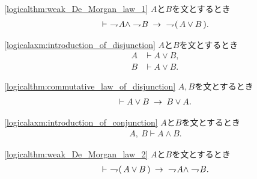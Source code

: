 	\begin{screen}
		\begin{logicalthm}
		\ref{logicalthm:weak_De_Morgan_law_1}
			$A$と$B$を文とするとき
			\begin{align}
				\vdash\ \rightharpoondown\hspace{-0.25em} A \wedge \rightharpoondown\hspace{-0.25em} B
				\hspace{0.25em}\rightarrow\hspace{0.25em}\ \rightharpoondown\hspace{-0.25em} (\, A \vee B\, ).
			\end{align}
		\end{logicalthm}
	\end{screen}
	
	\begin{screen}
		\begin{logicalaxm}[論理和の導入]
		\ref{logicalaxm:introduction_of_disjunction}
			$A$と$B$を文とするとき
			\begin{align}
				A &\vdash A \vee B, \\
				B &\vdash A \vee B.
			\end{align}
		\end{logicalaxm}
	\end{screen}
	
	\begin{screen}
		\begin{logicalthm}[論理和の可換律]
		\ref{logicalthm:commutative_law_of_disjunction}
			$A,B$を文とするとき
			\begin{align}
				\vdash A \vee B \hspace{0.25em}\rightarrow\hspace{0.25em} B \vee A.
			\end{align}
		\end{logicalthm}
	\end{screen}
	
	\begin{screen}
		\begin{logicalaxm}[論理積の導入]
		\ref{logicalaxm:introduction_of_conjunction}
			$A$と$B$を文とするとき
			\begin{align}
				A,\ B \vdash A \wedge B.
			\end{align}
		\end{logicalaxm}
	\end{screen}
	
	\begin{screen}
		\begin{logicalthm}
		\ref{logicalthm:weak_De_Morgan_law_2}
			$A$と$B$を文とするとき
			\begin{align}
				\vdash\ \rightharpoondown\hspace{-0.25em} (\, A \vee B\, ) 
				\hspace{0.25em}\rightarrow\hspace{0.25em}\ \rightharpoondown\hspace{-0.25em} A \wedge \rightharpoondown\hspace{-0.25em} B.
			\end{align}
		\end{logicalthm}
	\end{screen}
	
